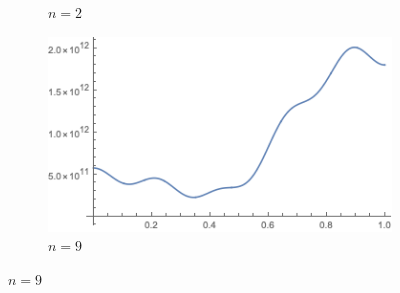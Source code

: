 \documentclass[12pt,letterpaper,reqno]{amsart}
\begin{document}
\begin{enumerate}[1.]
\begin{figure}[h]
\begin{subfigure}{.33\textwidth}
  \caption*{$n=2$}
\end{subfigure}
\begin{subfigure}{.33\textwidth}
  \centering
  \includegraphics[width=.8\linewidth]{./RussiaGDPn9.png}
  \caption*{$n=9$}
\end{subfigure}
\end{figure}


\end{enumerate}
\end{document}
